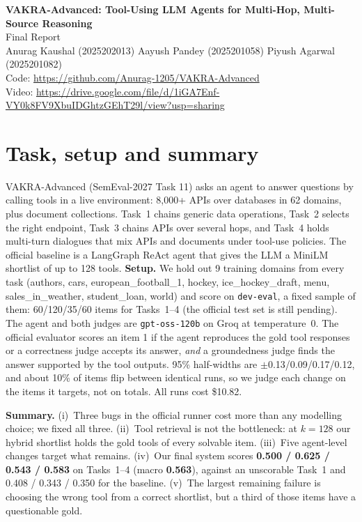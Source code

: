 \documentclass[10pt]{article}
\begin{document}
\begin{center}
{\fontsize{13}{16}\selectfont\bfseries VAKRA-Advanced: Tool-Using LLM Agents for Multi-Hop, Multi-Source Reasoning}\\[0.3em]
{\normalsize Final Report}\\[0.3em]
{\small Anurag Kaushal (2025202013) \quad Aayush Pandey (2025201058) \quad Piyush Agarwal (2025201082)}\\[0.1em]
{\small Code: \url{https://github.com/Anurag-1205/VAKRA-Advanced}}\\
{\small Video: \url{https://drive.google.com/file/d/1iGA7Enf-VY0k8FV9XbuIDGhtzGEhT29l/view?usp=sharing}}
\end{center}
\vspace{-0.4em}

\section{Task, setup and summary}
VAKRA-Advanced (SemEval-2027 Task 11) asks an agent to answer questions by calling tools in a live
environment: 8,000+ APIs over databases in 62 domains, plus document collections. Task~1 chains
generic data operations, Task~2 selects the right endpoint, Task~3 chains APIs over several hops,
and Task~4 holds multi-turn dialogues that mix APIs and documents under tool-use policies. The
official baseline is a LangGraph ReAct agent that gives the LLM a MiniLM shortlist of up to 128
tools. \textbf{Setup.} We hold out 9 training domains from every task (authors, cars,
european\_football\_1, hockey, ice\_hockey\_draft, menu, sales\_in\_weather, student\_loan, world)
and score on \texttt{dev-eval}, a fixed sample of them: 60/120/35/60 items for Tasks~1--4 (the
official test set is still pending). The agent and both judges are \texttt{gpt-oss-120b} on Groq at
temperature~0. The official evaluator scores an item 1 if the agent reproduces the gold tool
responses or a correctness judge accepts its answer, \emph{and} a groundedness judge finds the
answer supported by the tool outputs. 95\% half-widths are $\pm$0.13/0.09/0.17/0.12, and about
10\% of items flip between identical runs, so we judge each change on the items it targets, not on
totals. All runs cost \$10.82.

\textbf{Summary.} (i)~Three bugs in the official runner cost more than any modelling choice; we
fixed all three. (ii)~Tool retrieval is not the bottleneck: at $k{=}128$ our hybrid shortlist holds
the gold tools of every solvable item. (iii)~Five agent-level changes target what remains. (iv)~Our
final system scores \textbf{0.500 / 0.625 / 0.543 / 0.583} on Tasks~1--4 (macro \textbf{0.563}),
against an unscorable Task~1 and 0.408 / 0.343 / 0.350 for the baseline. (v)~The largest remaining
failure is choosing the wrong tool from a correct shortlist, but a third of those items have a
questionable gold.
\end{document}

